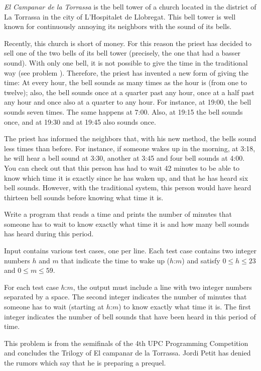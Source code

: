 

\Statement


\emph{El Campanar de la Torrassa} is the bell tower of a church
located in the district of La Torrassa in the city of L'Hospitalet de
Llobregat. This bell tower is well known for continuously annoying its
neighbors with the sound of its bells.

\medskip 

Recently, this church is short of money. For this reason the
priest has decided to sell one of the two bells of its bell tower
(precisely, the one that had a basser sound). With only one bell,
it is not possible to give the time in the traditional way (see problem
).
Therefore, the priest has invented a new form of giving the time: At
every hour, the bell sounds as many times as the hour is (from one
to twelve); also, the bell sounds once at a quarter past any hour, once at a half
past any hour and once also at a quarter to any hour. For instance, at 19:00,
the bell sounds seven times.
The same happens at 7:00. Also, at 19:15 the bell
sounds once, and at 19:30 and at 19:45 also sounds once.

\medskip

The priest has informed the neighbors that, with his new method, the
bells sound less times than before. For instance, if someone wakes up in the morning,
at 3:18, he will hear a bell sound at
3:30, another at 3:45 and four bell sounds at 4:00. You can check out
that this person has had to wait 42 minutes to be able to know which
time it is exactly since he has waken up, and that
he has heard six bell sounds.
However, with the traditional system, this person would have heard
thirteen bell sounds before knowing what time it is.

\medskip

Write a program that reads a time and prints the number
of minutes that someone has to wait to know exactly what time it is and how many
bell sounds has heard during this period.


\Input

Input contains various test cases, one per line. Each test case contains
two integer numbers $h$ and $m$ that indicate the time to wake up ($h$:$m$) and
satisfy $0\le h\le 23$ and $0\le m\le 59$. 


\Output

For each test case $h$:$m$, the output
must include a line with two integer numbers separated by a space.
The second integer indicates the number of minutes that someone
has to wait (starting at $h$:$m$) to know exactly what time it is.
The first integer indicates the number of bell sounds that have been
heard in this period of time.


\Sample

\Observation

This problem is from the semifinals of the 4th UPC Programming Competition 
and concludes the Trilogy of El campanar de la Torrassa. Jordi Petit has denied
the rumors which say that he is preparing a prequel.
